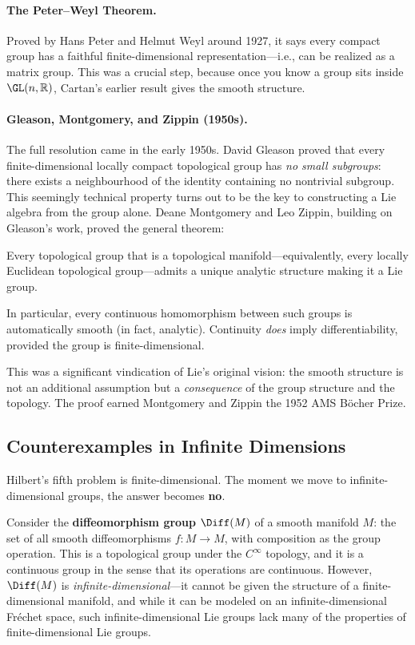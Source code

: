 \paragraph{The Peter--Weyl Theorem.} Proved by Hans Peter and Helmut Weyl around 1927, it says every compact group has a faithful finite-dimensional representation---i.e., can be realized as a matrix group. This was a crucial step, because once you know a group sits inside $\GL(n,\mathbb{R})$, Cartan's earlier result gives the smooth structure.

\paragraph{Gleason, Montgomery, and Zippin (1950s).} The full resolution came in the early 1950s. David Gleason proved that every finite-dimensional locally compact topological group has \emph{no small subgroups}: there exists a neighbourhood of the identity containing no nontrivial subgroup. This seemingly technical property turns out to be the key to constructing a Lie algebra from the group alone. Deane Montgomery and Leo Zippin, building on Gleason's work, proved the general theorem:

\begin{theorem}\label{thm:hilbert-5}
Every topological group that is a topological manifold---equivalently, every locally Euclidean topological group---admits a unique analytic structure making it a Lie group.
\end{theorem}

In particular, every continuous homomorphism between such groups is automatically smooth (in fact, analytic). Continuity \emph{does} imply differentiability, provided the group is finite-dimensional.

This was a significant vindication of Lie's original vision: the smooth structure is not an additional assumption but a \emph{consequence} of the group structure and the topology. The proof earned Montgomery and Zippin the 1952 AMS Böcher Prize.

\subsection{Counterexamples in Infinite Dimensions}

Hilbert's fifth problem is finite-dimensional. The moment we move to infinite-dimensional groups, the answer becomes \textbf{no}.

Consider the \textbf{diffeomorphism group} $\Diff(M)$ of a smooth manifold $M$: the set of all smooth diffeomorphisms $f \colon M \to M$, with composition as the group operation. This is a topological group under the $C^\infty$ topology, and it is a continuous group in the sense that its operations are continuous. However, $\Diff(M)$ is \emph{infinite-dimensional}---it cannot be given the structure of a finite-dimensional manifold, and while it can be modeled on an infinite-dimensional Fréchet space, such infinite-dimensional Lie groups lack many of the properties of finite-dimensional Lie groups.

